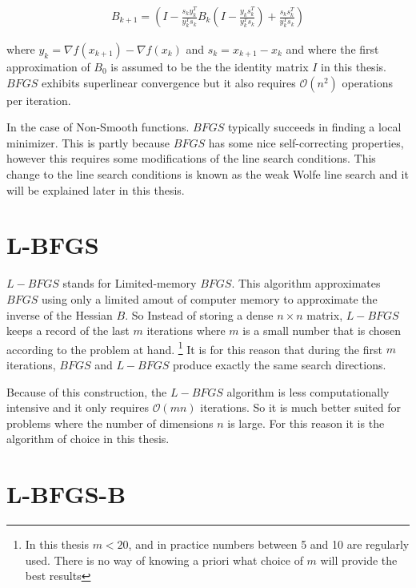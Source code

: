 \begin{equation} \label{bfgsupdate}
  \begin{aligned}
    B_{k+1} = \left(I - \frac{s_ky_k^T}{y_k^Ts_k} B_{k} \left( I - \frac{y_ks_k^T}{y_k^Ts_k} \right) + \frac{s_k s_k^T}{y_k^T s_k}\right)
  \end{aligned}
\end{equation}

where $y_k = \nabla f(x_{k+1}) - \nabla f(x_k)$ and $s_k = x_{k+1} - x_k$ and where the first approximation of $B_0$ is assumed to be the the identity matrix $I$ in this thesis.  $BFGS$ exhibits superlinear convergence but it also requires $\mathcal{O}(n^2)$ operations per iteration. \citep{nocedal}

In the case of Non-Smooth functions. $BFGS$ typically succeeds in finding a local minimizer. This is partly because $BFGS$ has some nice self-correcting properties, however this requires some modifications of the line search conditions. This change to the line search conditions is known as the weak Wolfe line search and it will be explained later in this thesis.

\section{L-BFGS}

$L-BFGS$ stands for Limited-memory $BFGS$. This algorithm approximates $BFGS$ using only a limited amout of computer memory to approximate the inverse of the Hessian $B$. So Instead of storing a dense $n \times n$ matrix, $L-BFGS$ keeps a record of the last $m$ iterations where $m$ is a small number that is chosen according to the problem at hand. \footnote{In this thesis $m < 20$, and in practice numbers between 5 and 10 are regularly used. There is no way of knowing a priori what choice of $m$ will provide the best results} It is for this reason that during the first $m$ iterations, $BFGS$ and $L-BFGS$ produce exactly the same search directions.

Because of this construction, the $L-BFGS$ algorithm is less computationally intensive and it only requires $\mathcal{O}(mn)$ iterations. So it is much better suited for problems where the number of dimensions $n$ is large. For this reason it is the algorithm of choice in this thesis.

\section{L-BFGS-B}

